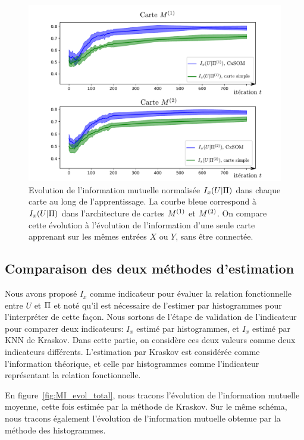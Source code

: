 \begin{figure}
\includegraphics[width=\textwidth]{evolution_MI_binning}
\caption{Evolution de l'information mutuelle normalisée $I_x(U|\Pi)$ dans chaque carte au long de l'apprentissage. La courbe bleue correspond à $I_x(U|\Pi)$ dans l'architecture de cartes $M^{({1})}$ et $M^{({2})}$. On compare cette évolution à l'évolution de l'information d'une seule carte apprenant sur les mêmes entrées $X$ ou $Y$, sans être connectée.}
\label{fig:MI_evol}
\end{figure}

\subsection{Comparaison des deux méthodes d'estimation}

Nous avons proposé $I_x$ comme indicateur pour évaluer la relation fonctionnelle entre $U$ et $\Pi$ et noté qu'il est nécessaire de l'estimer par histogrammes pour l'interpréter de cette façon.
Nous sortons de l'étape de validation de l'indicateur pour comparer deux indicateurs: $I_x$ estimé par histogrammes, et $I_x$ estimé par KNN de Kraskov. Dans cette partie, on considère ces deux valeurs comme deux indicateurs différents. L'estimation par Kraskov est considérée comme l'information théorique, et celle par histogrammes comme l'indicateur représentant la relation fonctionnelle.

En figure~\ref{fig:MI_evol_total}, nous tracons l'évolution de l'information mutuelle moyenne, cette fois estimée par la méthode de Kraskov. Sur le même schéma, nous tracons également l'évolution de l'information mutuelle obtenue par la méthode des histogrammes. 

